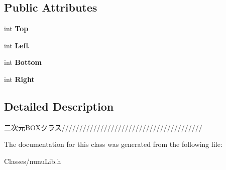 \subsection*{Public Attributes}
\begin{DoxyCompactItemize}
\item 
int {\bfseries Top}\hypertarget{class_c_rect_acd514ebe4843ae49ae3a02da7c18546e}{}\label{class_c_rect_acd514ebe4843ae49ae3a02da7c18546e}

\item 
int {\bfseries Left}\hypertarget{class_c_rect_afbeea9a97235280389aba0cc881a1d22}{}\label{class_c_rect_afbeea9a97235280389aba0cc881a1d22}

\item 
int {\bfseries Bottom}\hypertarget{class_c_rect_a13fe0739f59e06cb5a2ab4a4465b2343}{}\label{class_c_rect_a13fe0739f59e06cb5a2ab4a4465b2343}

\item 
int {\bfseries Right}\hypertarget{class_c_rect_aef5f621e8db98b4e61ba8d0e9816fff5}{}\label{class_c_rect_aef5f621e8db98b4e61ba8d0e9816fff5}

\end{DoxyCompactItemize}


\subsection{Detailed Description}
二次元\+B\+O\+Xクラス//////////////////////////////////////// 

The documentation for this class was generated from the following file\+:\begin{DoxyCompactItemize}
\item 
Classes/nunu\+Lib.\+h\end{DoxyCompactItemize}
